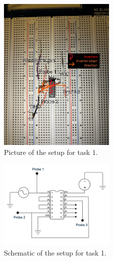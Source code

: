 \documentclass[onecolumn]{article}
\begin{document}
\begin{figure}[h!]
    \centering
    \includegraphics[width=0.5\textwidth]{Circuit_draw.jpg}
    \caption{Picture of the setup for task 1.}  
    \label{fig:circuit}
\end{figure}

\begin{figure}[h!]
    \centering
    \includegraphics[width=0.5\textwidth]{circuit_schematics.png}
    \caption{Schematic of the setup for task 1.}
    \label{fig:schematic}
\end{figure}
\end{document}
